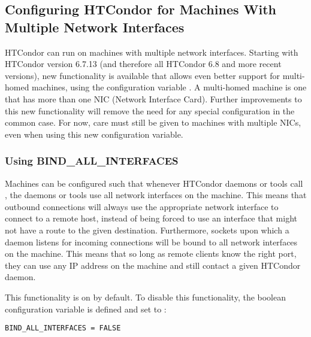 \subsection{\label{sec:Multiple-Interfaces}Configuring HTCondor for
Machines With Multiple Network Interfaces } 


HTCondor can run on machines with
multiple network interfaces.
Starting with HTCondor version 6.7.13
(and therefore all HTCondor 6.8 and more recent versions),
new functionality is
available that allows even better support for multi-homed
machines, using the configuration variable .
A multi-homed machine is one that has more than one
NIC (Network Interface Card).
Further improvements to this new functionality will remove the need
for any special configuration in the common case.
For now, care
must still be given to machines with multiple NICs, even
when using this new configuration variable.


\subsubsection{\label{sec:Using-BindAllInterfaces}Using 
BIND\_ALL\_INTERFACES}

Machines can be configured such that
whenever HTCondor daemons or tools
call , the daemons or tools use all network interfaces on
the machine.
This means that outbound connections will always use the appropriate
network interface to connect to a remote host,
instead of being forced to use
an interface that might not have a route to the given destination.
Furthermore, sockets upon which a daemon listens for incoming connections 
will be bound to all network interfaces on the machine.
This means that so long as remote clients know the right port, they can
use any IP address on the machine and still contact a given HTCondor daemon.

This functionality is on by default.  To disable this functionality, 
the boolean configuration
variable
is defined and set to :

\begin{verbatim}
BIND_ALL_INTERFACES = FALSE
\end{verbatim}

